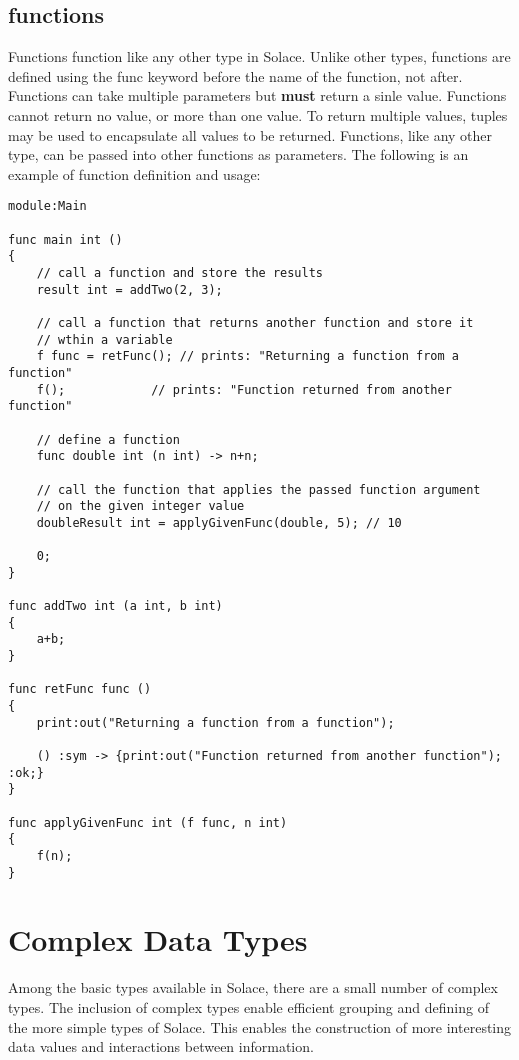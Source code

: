 \documentclass{article}
\begin{document}
\subsection{functions}

Functions function like any other type in Solace. Unlike other types, functions are
defined using the func keyword before the name of the function, not after. Functions
can take multiple parameters but \textbf{must} return a sinle value. Functions cannot return
no value, or more than one value. To return multiple values, tuples may be used to
encapsulate all values to be returned.
Functions, like any other type, can be passed into other functions as parameters.
The following is an example of function definition and usage:

\begin{lstlisting}
module:Main

func main int ()
{
	// call a function and store the results
	result int = addTwo(2, 3);
	
	// call a function that returns another function and store it
	// wthin a variable
	f func = retFunc(); // prints: "Returning a function from a function"
	f();		    // prints: "Function returned from another function"
	
	// define a function
	func double int (n int) -> n+n;
	
	// call the function that applies the passed function argument
	// on the given integer value
	doubleResult int = applyGivenFunc(double, 5); // 10
	
	0;
}

func addTwo int (a int, b int)
{
	a+b;
}

func retFunc func ()
{
	print:out("Returning a function from a function");
	
	() :sym -> {print:out("Function returned from another function"); :ok;}
}

func applyGivenFunc int (f func, n int)
{
	f(n);
}
\end{lstlisting}

\section{Complex Data Types}

Among the basic types available in Solace, there are a small number of complex types. The inclusion
of complex types enable efficient grouping and defining of the more simple types of Solace. This
enables the construction of more interesting data values and interactions between information.
\end{document}

